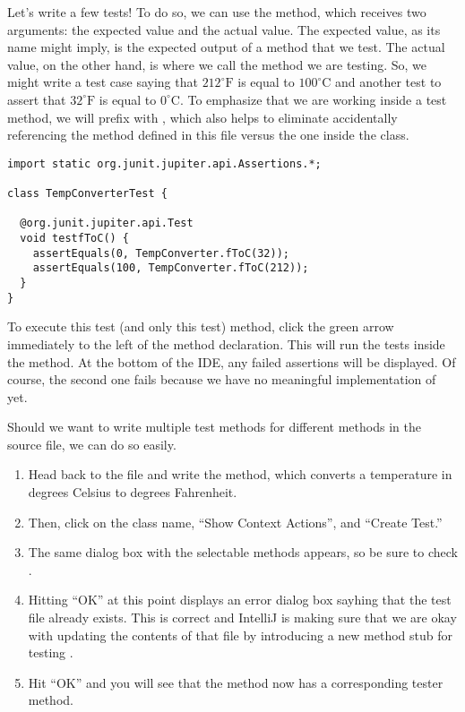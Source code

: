   Let's write a few tests! 
  To do so, we can use the  method, which receives two arguments: the expected value and the actual value. 
  The expected value, as its name might imply, is the expected output of a method that we test. 
  The actual value, on the other hand, is where we call the method we are testing. 
  So, we might write a test case saying that $212^{\circ}\text{F}$ is equal to $100^{\circ}\text{C}$ and another test to assert that $32^{\circ}\text{F}$ is equal to $0^{\circ}\text{C}$. 
  To emphasize that we are working inside a test method, we will prefix  with , which also helps to eliminate accidentally referencing the  method defined in this file versus the one inside the  class.

\begin{lstlisting}[language=MyJava]
import static org.junit.jupiter.api.Assertions.*;

class TempConverterTest {

  @org.junit.jupiter.api.Test
  void testfToC() {
    assertEquals(0, TempConverter.fToC(32));
    assertEquals(100, TempConverter.fToC(212));
  }
}
\end{lstlisting}

To execute this test (and only this test) method, click the green arrow immediately to the left of the method declaration. 
This will run the tests inside the method.
At the bottom of the IDE, any failed assertions will be displayed.
Of course, the second one fails because we have no meaningful implementation of  yet. 

Should we want to write multiple test methods for different methods in the source file, we can do so easily. 
\begin{enumerate}[label=(\arabic*)]
  \item Head back to the  file and write the  method, which converts a temperature in degrees Celsius to degrees Fahrenheit. 
  \item Then, click on the class name, ``Show Context Actions'', and ``Create Test.'' 
  \item The same dialog box with the selectable methods appears, so be sure to check . 
  \item Hitting ``OK'' at this point displays an error dialog box sayhing that the test file already exists. This is correct and IntelliJ is making sure that we are okay with updating the contents of that file by introducing a new method stub for testing . 
  \item Hit ``OK'' and you will see that the  method now has a corresponding tester method. 
\end{enumerate}

